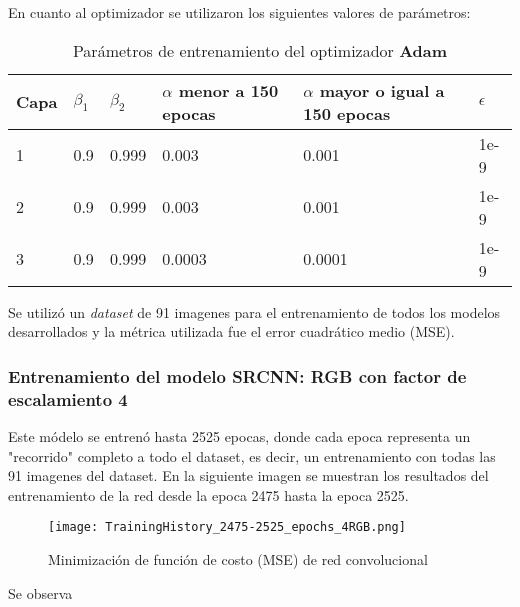 En cuanto al optimizador se utilizaron los siguientes valores de parámetros:

\begin{table}[H]
    \centering
    \caption{Parámetros de entrenamiento del optimizador \textbf{Adam}}
    \begin{tabular}{|l|l|l|l|l|l|}
    \hline
    \textbf{Capa} & \textbf{$\beta_1$} & \textbf{$\beta_2$}  & \textbf{$\alpha$ menor a 150 epocas} & \textbf{$\alpha$ mayor o igual a 150 epocas} & \textbf{$\epsilon$}\\ \hline
    1             & 0.9           & 0.999          & 0.003                                        & 0.001                                        & 1e-9                 \\
    2             & 0.9           & 0.999          & 0.003                                        & 0.001                                        & 1e-9                 \\
    3             & 0.9           & 0.999          & 0.0003                                       & 0.0001                                       & 1e-9                 \\ \hline
    \end{tabular}
\end{table}

Se utilizó un \emph{dataset} de 91 imagenes para el entrenamiento de todos los modelos desarrollados y la métrica utilizada fue el
error cuadrático medio (MSE).

\subsubsection{Entrenamiento del modelo SRCNN: RGB con factor de escalamiento 4}
Este módelo se entrenó hasta 2525 epocas, donde cada epoca representa un "recorrido" completo a todo el dataset, es decir, un
entrenamiento con todas las 91 imagenes del dataset. En la siguiente imagen se muestran los resultados del entrenamiento de la
red desde la epoca 2475 hasta la epoca 2525.

\begin{figure}[H]
    \label{fig:SRCNN_MSE_TrainingLoss4RGB}
    \centering
    \texttt{[image: TrainingHistory\_2475-2525\_epochs\_4RGB.png]}
    \caption{Minimización de función de costo (MSE) de red convolucional}
\end{figure}

Se observa 